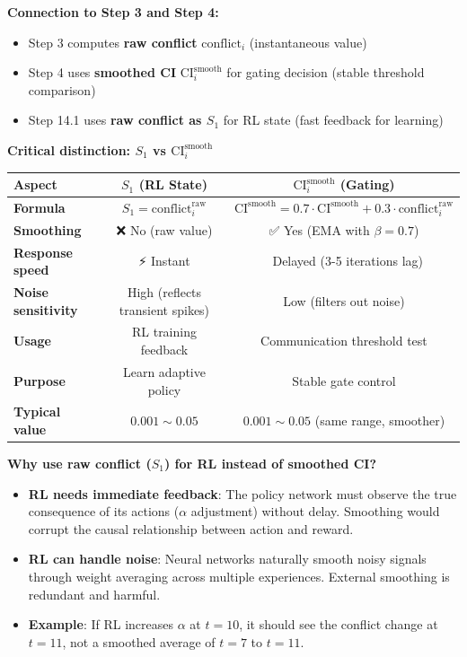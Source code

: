 \documentclass[11pt,a4paper]{article}
\begin{document}
\begin{itemize}
\textbf{Connection to Step 3 and Step 4:}
\begin{itemize}
    \item Step 3 computes \textbf{raw conflict} $\text{conflict}_i$ (instantaneous value)
    \item Step 4 uses \textbf{smoothed CI} $\text{CI}_i^{\text{smooth}}$ for gating decision (stable threshold comparison)
    \item Step 14.1 uses \textbf{raw conflict as $S_1$} for RL state (fast feedback for learning)
\end{itemize}

\textbf{Critical distinction: $S_1$ vs $\text{CI}_i^{\text{smooth}}$}

\begin{center}
\begin{tabular}{|l|c|c|}
\hline
\textbf{Aspect} & \textbf{$S_1$ (RL State)} & \textbf{$\text{CI}_i^{\text{smooth}}$ (Gating)} \\
\hline
\textbf{Formula} & $S_1 = \text{conflict}_i^{\text{raw}}$ & $\text{CI}^{\text{smooth}} = 0.7 \cdot \text{CI}^{\text{smooth}} + 0.3 \cdot \text{conflict}_i^{\text{raw}}$ \\
\hline
\textbf{Smoothing} & ❌ No (raw value) & ✅ Yes (EMA with $\beta=0.7$) \\
\hline
\textbf{Response speed} & ⚡ Instant & 🐌 Delayed (3-5 iterations lag) \\
\hline
\textbf{Noise sensitivity} & High (reflects transient spikes) & Low (filters out noise) \\
\hline
\textbf{Usage} & RL training feedback & Communication threshold test \\
\hline
\textbf{Purpose} & Learn adaptive policy & Stable gate control \\
\hline
\textbf{Typical value} & $0.001 \sim 0.05$ & $0.001 \sim 0.05$ (same range, smoother) \\
\hline
\end{tabular}
\end{center}

\textbf{Why use raw conflict ($S_1$) for RL instead of smoothed CI?}

\begin{itemize}
    \item \textbf{RL needs immediate feedback}: The policy network must observe the true consequence of its actions ($\alpha$ adjustment) without delay. Smoothing would corrupt the causal relationship between action and reward.
    \item \textbf{RL can handle noise}: Neural networks naturally smooth noisy signals through weight averaging across multiple experiences. External smoothing is redundant and harmful.
    \item \textbf{Example}: If RL increases $\alpha$ at $t=10$, it should see the conflict change at $t=11$, not a smoothed average of $t=7$ to $t=11$.
\end{itemize}


\end{itemize}
\end{document}
